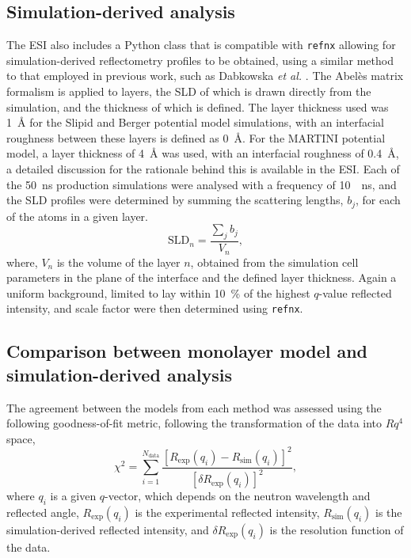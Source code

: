 \documentclass[amsmath,amssymb,twocolumn,superscriptaddress]{revtex4-1}
\begin{document}
\subsection{Simulation-derived analysis}
The ESI also includes a Python class that is compatible with \texttt{refnx} \cite{nelson_refnx_2019,nelson_refnx_2018} allowing for simulation-derived reflectometry profiles to be obtained, using a similar method to that employed in previous work, such as Dabkowska \emph{et al.} \cite{dabkowska_modulation_2014}.
The Abel\`{e}s matrix formalism is applied to layers, the SLD of which is drawn directly from the simulation, and the thickness of which is defined.
The layer thickness used was \SI{1}{\angstrom} for the Slipid and Berger potential model simulations, with an interfacial roughness between these layers is defined as \SI{0}{\angstrom}.
For the MARTINI potential model, a layer thickness of \SI{4}{\angstrom} was used, with an interfacial roughness of \SI{0.4}{\angstrom}, a detailed discussion for the rationale behind this is available in the ESI.
Each of the \SI{50}{\nano\second} production simulations were analysed with a frequency of \SI{10}{\per\nano\second}, and the SLD profiles were determined by summing the scattering lengths, $b_j$, for each of the atoms in a given layer.
%
\begin{equation}
  \text{SLD}_n = \frac{\sum_j{b_j}}{V_n},
\end{equation}
%
where, $V_n$ is the volume of the layer $n$, obtained from the simulation cell parameters in the plane of the interface and the defined layer thickness.
Again a uniform background, limited to lay within \SI{10}{\percent} of the highest $q$-value reflected intensity, and scale factor were then determined using \texttt{refnx}.

\subsection{Comparison between monolayer model and simulation-derived analysis}
\label{sec:para}
The agreement between the models from each method was assessed using the following goodness-of-fit metric, following the transformation of the data into $Rq^4$ space,
%
\begin{equation}
  \chi^2 = \sum_{i=1}^{N_{\text{data}}} \frac{[R_{\text{exp}}(q_i) -
  R_{\text{sim}}(q_i)]^2}{[\delta R_{\text{exp}}(q_i)]^2},
\end{equation}
%
where $q_i$ is a given $q$-vector, which depends on the neutron wavelength and reflected angle, $R_{\text{exp}}(q_i)$ is the experimental reflected intensity, $R_{\text{sim}}(q_i)$ is the simulation-derived reflected intensity, and $\delta R_{\text{exp}}(q_i)$ is the resolution function of the data.
\end{document}

